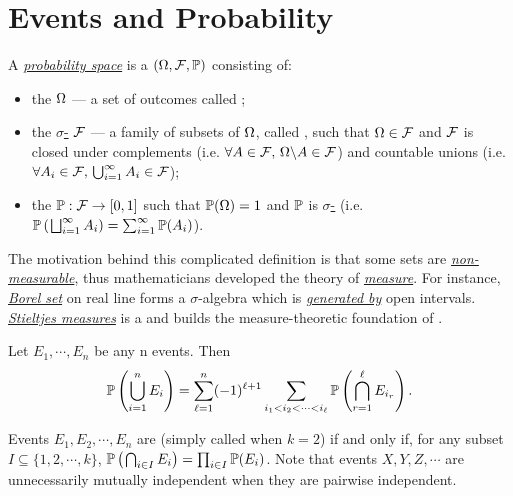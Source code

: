 \documentclass[main.tex]{subfiles}
\begin{document}
\minispacing

\section{Events and Probability}

A \href{https://en.wikipedia.org/wiki/Probability_space}{\it probability space} is a  $(\Omega,\mathcal{F},\mathbb{P})$ consisting of:

\begin{itemize}
	\item the  $\Omega$ --- a set of outcomes called ;
	\item the \href{https://en.wikipedia.org/wiki/%CE%A3-algebra}{$\sigma$-\ti{algebra}} $\mathcal{F}$ --- a family of subsets of $\Omega$, called \ti{events}, such that $\Omega \in \mathcal{F}$ and $\mathcal{F}$ is closed under complements (i.e. $\forall A \in \mathcal{F},\, \Omega \backslash A \in \mathcal{F}$) and countable unions (i.e. $\forall  A_i \in \mathcal{F},\, \bigcup_{i=1}^{\infty} A_i \in \mathcal{F}$);
	\item the  $\mathbb{P}: \mathcal{F} \rightarrow [0,1]$ such that $\mathbb{P}(\Omega)=1$ and $\mathbb{P}$ is \href{https://en.wikipedia.org/wiki/Sigma-additive_set_function}{$\sigma$-} (i.e. $\mathbb{P}\left(\;\!\bigsqcup_{i=1}^{\infty} A_i\right) = \sum_{i=1}^{\infty} \mathbb{P}(A_i)$).
\end{itemize}

The motivation behind this complicated definition is that some sets are \href{https://en.wikipedia.org/wiki/Non-measurable_set}{\it non-measurable}, thus mathematicians developed the theory of \href{https://en.wikipedia.org/wiki/Measure_(mathematics)}{\it measure}. For instance, \href{https://en.wikipedia.org/wiki/Borel_set}{\it Borel set} on real line forms a $\sigma$-algebra which is \href{https://en.wikipedia.org/wiki/Carathéodory%27s_extension_theorem}{\it generated by} open intervals. \href{https://en.wikipedia.org/wiki/Lebesgue–Stieltjes_integration}{\it Stieltjes measures} is a \ti{Borel measure} and builds the measure-theoretic foundation of \ti{continuous probability distribution}.

\begin{lemma}
	Let $E_1,\cdots,E_n$ be any n events. Then
	\[
		\mathbb{P}\left(\bigcup_{i=1}^{n}E_i\right) = \sum_{\ell=1}^{n} (-1)^{\ell + 1} \sum_{i_1 < i_2 < \cdots < i_\ell} \mathbb{P} \left(\bigcap_{r=1}^{\ell}E_{i_r}\right).
	\]
\end{lemma}

Events $E_1,E_2,\cdots,E_n$ are  (simply called  when $k=2$) if and only if, for any subset $I \subseteq \{1,2,\cdots,k\}$,
$\mathbb{P}\left(\;\!\bigcap_{i\in I}E_i\right)=\prod_{i\in I}\mathbb{P}(E_i)$. Note that events $X,Y,Z,\cdots$ are unnecessarily mutually independent when they are pairwise independent.
\end{document}
